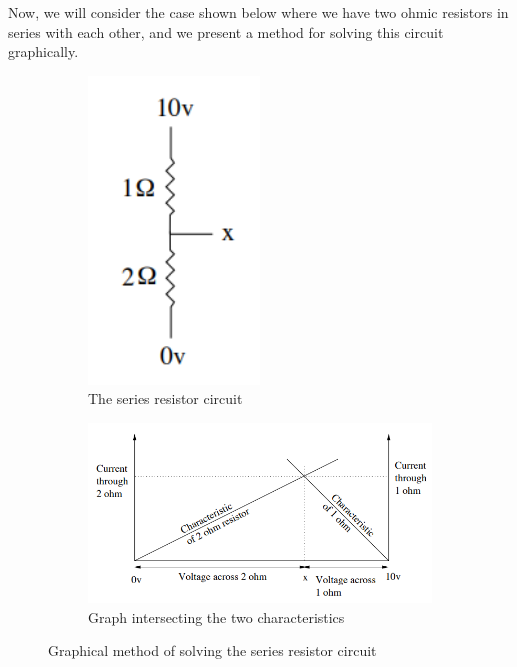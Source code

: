 \documentclass{article}
\begin{document}
Now, we will consider the case shown below where we have two ohmic resistors in series with each other, and we present a method for solving this circuit graphically.

\begin{figure}[htbp]
    \centering
    \begin{subfigure}[b]{0.45\textwidth}
        \centering
        \includegraphics[width=0.5\textwidth]{images/Screenshot 2024-04-06 110954.png}
        \caption{The series resistor circuit}
        \label{fig:image1}
    \end{subfigure}
    \hfill
    \begin{subfigure}[b]{0.5\textwidth}
        \centering
        \includegraphics[width=1\textwidth]{images/Screenshot 2024-04-06 111001.png}
        \caption{Graph intersecting the two characteristics}
        \label{fig:image2}
    \end{subfigure}
    \caption{Graphical method of solving the series resistor circuit}
    \label{fig:both}
\end{figure}
\end{document}
